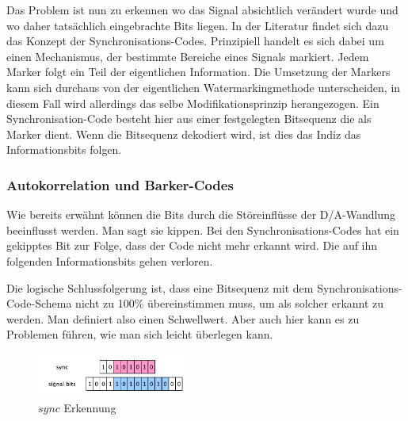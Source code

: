 Das Problem ist nun zu erkennen wo das Signal absichtlich verändert wurde und wo daher tatsächlich eingebrachte Bits liegen. In der Literatur findet sich dazu das Konzept der Synchron\-isations-Codes\cite{xiang2007robust}\cite{chang2012location}\cite{li2000transparent}\cite{ansari2004data}\cite{huang2002blind}\cite{petrovic1999data}\cite{wu2005efficiently}. Prinzipiell handelt es sich dabei um einen Mechanismus, der bestimmte Bereiche eines Signals markiert. Jedem Marker folgt ein Teil der eigentlichen Information. Die Umsetzung der Markers kann sich durchaus von der eigentlichen Watermarkingmethode unterscheiden, in diesem Fall wird allerdings das selbe Modifikationsprinzip herangezogen. 
Ein Synchronisation-Code besteht hier aus einer festgelegten Bitsequenz die als Marker dient. Wenn die Bitsequenz dekodiert wird, ist dies das Indiz das Informationsbits folgen. 

\subsubsection{Autokorrelation und Barker-Codes}
\label{sec:barker-code}


Wie bereits erwähnt können die Bits durch die Störeinflüsse der D/A-Wandlung beeinflusst werden. Man sagt sie \glqq{}kippen\grqq{}. Bei den Synchronisations-Codes hat ein gekipptes Bit zur Folge, dass der Code nicht mehr erkannt wird. Die auf ihn folgenden Informationsbits gehen verloren. 

Die logische Schlussfolgerung ist, dass eine Bitsequenz mit dem Synchronisations-Code-Schema nicht zu 100\% übereinstimmen muss, um als solcher erkannt zu werden. Man definiert also einen Schwellwert. Aber auch hier kann es zu Problemen führen, wie man sich leicht überlegen kann. 

\begin{figure}
	\includegraphics[width=0.45\textwidth]{figures/figure-sync-code-detection.pdf}
	\caption{$sync$ Erkennung}
	\label{fig:sync-code-detection}
\end{figure}


